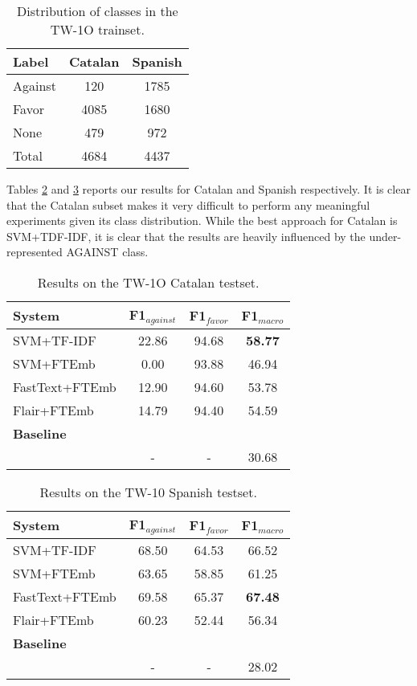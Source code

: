 \documentclass[10pt, a4paper]{article}
\begin{document}
\begin{table}[!ht]
\centering
\begin{tabular}{lcc} \hline
      Label & Catalan & Spanish\\ \hline
    Against & 120 & 1785 \\
      Favor & 4085 & 1680 \\
     None & 479 & 972 \\ \hline
      Total & 4684 & 4437 \\ \hline
\end{tabular}
\caption{Distribution of classes in the TW-1O trainset.}\label{tab:twdatasetdistr}
\end{table}

Tables \ref{tab:result_tw1o_ca} and \ref{tab:result_tw1o_es} reports our results for Catalan and Spanish respectively. It is clear that the Catalan subset makes it very difficult to perform any meaningful experiments given its class distribution. While the best approach for Catalan is SVM+TDF-IDF, it is clear that the results are heavily influenced by the under-represented AGAINST class.

\begin{table}[!ht]\small
\centering
\begin{tabular}{lccc} \hline
\textbf{System} & F1$_{against}$ & F1$_{favor}$ & F1$_{macro}$\\ \hline
SVM+TF-IDF & 22.86 & 94.68 & \textbf{58.77} \\
SVM+FTEmb & 0.00 & 93.88 & 46.94 \\
FastText+FTEmb & 12.90 & 94.60 & 53.78 \\
Flair+FTEmb & 14.79 & 94.40 & 54.59 \\ \hline
\textbf{Baseline} \\
\scriptsize{\cite{Cuquerella2018CriCaTM}} & - & - & 30.68 \\  \hline
\end{tabular}
\caption{Results on the TW-1O Catalan testset.}\label{tab:result_tw1o_ca}
\end{table}

\begin{table}[!ht]\small
\centering
\begin{tabular}{lccc} \hline
\textbf{System} & F1$_{against}$ & F1$_{favor}$ & F1$_{macro}$ \\ \hline
SVM+TF-IDF & 68.50 & 64.53 & 66.52 \\
SVM+FTEmb & 63.65 & 58.85 & 61.25 \\
FastText+FTEmb & 69.58 & 65.37 & \textbf{67.48} \\
Flair+FTEmb & 60.23 & 52.44 & 56.34 \\ \hline
\textbf{Baseline} \\
\cite{Segura-Bedmar18} & - & - & 28.02 \\ \hline
\end{tabular}
\caption{Results on the TW-10 Spanish testset.}\label{tab:result_tw1o_es}
\end{table}
\end{document}
